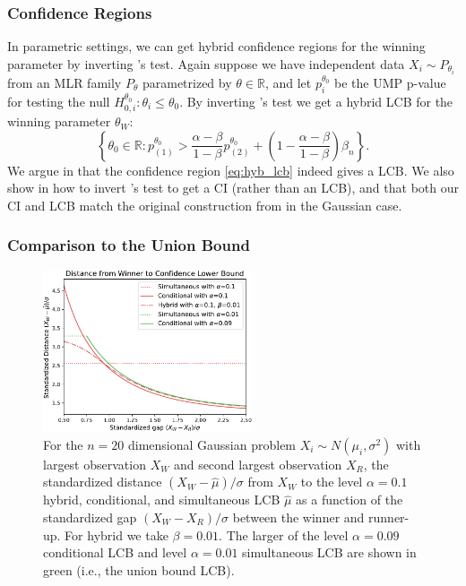 \documentclass{article}
\newcommand{\R}{\mathbb{R}}
\begin{document}
\subsubsection{Confidence Regions}

In parametric settings, we can get hybrid confidence regions for the winning parameter by inverting 's test. Again suppose we have independent data $X_i \sim P_{\theta_i}$ from an MLR family $P_{\theta}$ parametrized by $\theta \in \R$, and let $p_i^{\theta_0}$ be the UMP p-value for testing the null $H^{\theta_0}_{0, i} : \theta_i \leq \theta_0$. By inverting 's test we get a hybrid LCB for the winning parameter $\theta_W$:
\begin{equation}
    \label{eq:hyb_lcb}
    \left\{ \theta_0 \in \R:  p^{\theta_0}_{(1)} > \frac{\alpha-\beta}{1-\beta}p^{\theta_0}_{(2)}  + \left(1 - \frac{\alpha - \beta}{1 - \beta}\right) \beta_n \right\}.
\end{equation}
We argue in  that the confidence region \eqref{eq:hyb_lcb} indeed gives a LCB. We also show in  how to invert 's test to get a CI (rather than an LCB), and that both our CI and LCB match the original construction from \cite{Andrews2023} in the Gaussian case. 

\subsubsection{Comparison to the Union Bound}

\begin{figure}[]
    \centering
    \includegraphics[width=0.55\textwidth]{hyb_dist_to_winner.pdf}
    \caption{For the $n = 20$ dimensional Gaussian problem $X_i \sim N(\mu_i, \sigma^2)$ with largest observation $X_W$ and second largest observation $X_R$, the standardized distance $(X_W - \hat{\mu})/\sigma$ from $X_W$ to the level $\alpha = 0.1$ hybrid, conditional, and simultaneous LCB $\hat{\mu}$ as a function of the standardized gap $(X_W - X_R)/\sigma$ between the winner and runner-up. For hybrid we take $\beta = 0.01$. The larger of the level $\alpha = 0.09$ conditional LCB and level $\alpha = 0.01$ simultaneous LCB are shown in green (i.e., the union
    bound LCB).}
    \label{fig:hybrid}
\end{figure}
\end{document}
